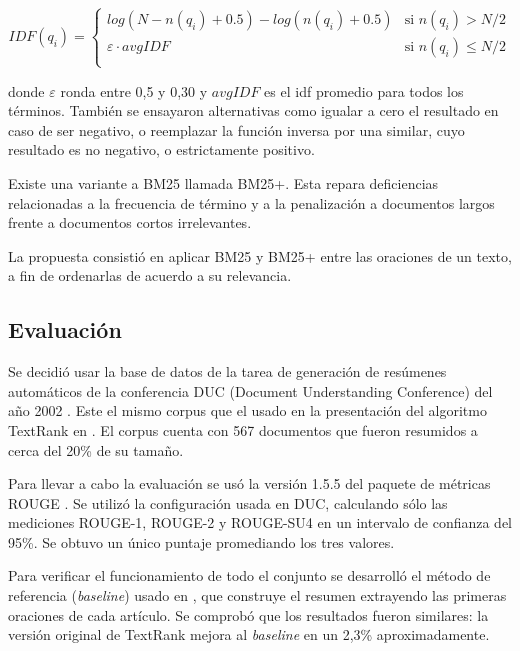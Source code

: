 \documentclass{llncs}
\begin{document}
\begin{equation}
 IDF(q_i) =
  \begin{cases}
       log(N - n(q_i) + 0.5) - log(n(q_i) + 0.5)    & \text{si }  n(q_i) > N/2\\
       \varepsilon \cdot avgIDF                     & \text{si }  n(q_i) \leq N/2\\
  \end{cases}
\end{equation}                
                
donde $\varepsilon$ ronda entre 0,5 y 0,30 y $avgIDF$ es el idf promedio para todos los términos.
También se ensayaron alternativas como igualar a cero el resultado en caso de ser negativo, o reemplazar la función inversa por una similar, cuyo resultado es no negativo, o estrictamente positivo. 

Existe una variante a BM25 llamada BM25+. Esta repara deficiencias relacionadas a la frecuencia de término y a la penalización a documentos largos frente a documentos cortos irrelevantes.

La propuesta consistió en aplicar BM25 y BM25+ entre las oraciones de un texto, a fin de ordenarlas de acuerdo a su relevancia.


\subsection{Evaluación}
Se decidió usar la base de datos de la tarea de generación de resúmenes automáticos de la conferencia DUC (Document Understanding Conference) del año 2002 \cite{duc2002-guidelines}. Este el mismo corpus que el usado en la presentación del algoritmo TextRank en \cite{mihalcea-tarau}. El corpus cuenta con 567 documentos que fueron resumidos a cerca del 20\% de su tamaño.

Para llevar a cabo la evaluación se usó la versión 1.5.5 del paquete de métricas ROUGE \cite{Lin2004a}. Se utilizó la configuración usada en DUC, calculando sólo las mediciones ROUGE-1, ROUGE-2 y ROUGE-SU4 en un intervalo de confianza del 95\%. Se obtuvo un único puntaje promediando los tres valores.

Para verificar el funcionamiento de todo el conjunto se desarrolló el método de referencia (\textit{baseline}) usado en \cite{mihalcea-tarau}, que construye el resumen extrayendo las primeras oraciones de cada artículo. Se comprobó que los resultados fueron similares: la versión original de TextRank mejora al \textit{baseline} en un 2,3\% aproximadamente.
\end{document}
